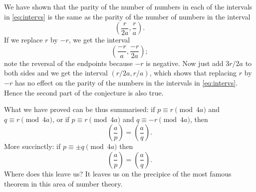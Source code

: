 \documentclass[a4paper]{article}
\newcommand{\leg}[2]{\left(\frac{#1}{#2}\right)}
\begin{document}
We have shown that the parity of the number of
numbers in each of the intervals in \eqref{eq:intervs}
is the same as the parity of the number of 
numbers in the interval \[\left(\frac{r}{2a},\frac{r}{a}\right).\]
If we replace \(r\) by \(-r\), we get the interval
\[\left(\frac{-r}{a},\frac{-r}{2a}\right);\]
note the reversal of the endpoints because \(-r\)
is negative.
Now just add \(3r/2a\) to both sides and we get
the interval \((r/2a,r/a)\), which shows that
replacing \(r\) by \(-r\) has no effect on the parity
of the numbers in the intervals in \eqref{eq:intervs}.
Hence the second part of the conjecture is also true.

What we have proved can be thus summarised: if
\(p\equiv r\pmod{4a}\) and \(q\equiv r\pmod{4a}\),
or if \(p\equiv r\pmod{4a}\) and \(q\equiv-r\pmod{4a}\), 
then \[\leg{a}{p}=\leg{a}{q}.\] 
More succinctly:
if \(p\equiv\pm q\pmod{4a}\) then \[\leg{a}{p}=\leg{a}{q}.\]
Where does this leave us? It leaves us on the precipice
of the most famous theorem in this area of number 
theory.
\pagebreak
\end{document}

